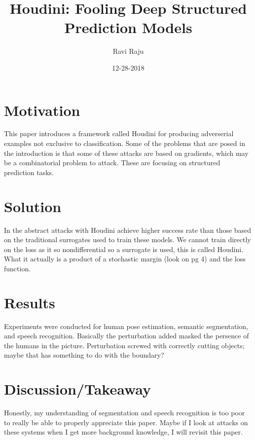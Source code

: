 \documentclass{article}
\title{Houdini: Fooling Deep Structured Prediction Models}
\date{12-28-2018}
\author{Ravi Raju}
\begin{document}
\maketitle
{}
{}
\section{Motivation}
This paper introduces a framework called Houdini for producing adverserial examples not exclusive to classification. Some of the problems that are posed in the introduction is that some of these attacks are based on gradients, which may be a combinatorial problem to attack. These are focusing on structured prediction tasks.
\section{Solution}
In the abstract attacks with Houdini achieve higher success rate than those based on the traditional surrogates used to train these models. We cannot train directly on the loss as it so nondifferential so a surrogate is used, this is called Houdini. What it actually is a product of a stochastic margin (look on pg 4) and the loss function.
\section{Results}
Experiments were conducted for human pose estimation, semantic segmentation, and speech recognition. Basically the perturbation added masked the persence of the humans in the picture. Perturbation screwed with correctly cutting objects; maybe that has something to do with the boundary?
\section{Discussion/Takeaway}
Honestly, my understanding of segmentation and speech recognition is too poor to really be able to properly appreciate this paper. Maybe if I look at attacks on these systems when I get more background knowledge, I will revisit this paper.
\end{document}
